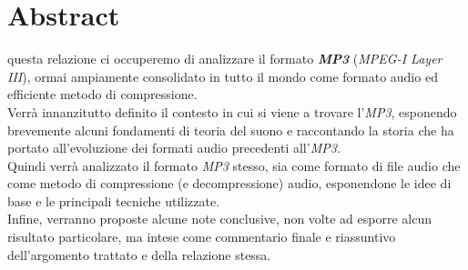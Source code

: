 \chapter*{Abstract}
	
	 questa relazione ci occuperemo di analizzare il formato \textbf{\textit{MP3}} (\textit{MPEG-I Layer III}), ormai ampiamente consolidato in tutto il mondo come formato audio ed efficiente metodo di compressione.\\
	Verrà innanzitutto definito il contesto in cui si viene a trovare l'\textit{MP3}, esponendo brevemente alcuni fondamenti di teoria del suono e raccontando la storia che ha portato all'evoluzione dei formati audio precedenti all'\textit{MP3}.\\
	Quindi verrà analizzato il formato \textit{MP3} stesso, sia come formato di file audio che come metodo di compressione (e decompressione) audio, esponendone le idee di base e le principali tecniche utilizzate.\\
	Infine, verranno proposte alcune note conclusive, non volte ad esporre alcun risultato particolare, ma intese come commentario finale e riassuntivo dell'argomento trattato e della relazione stessa. 